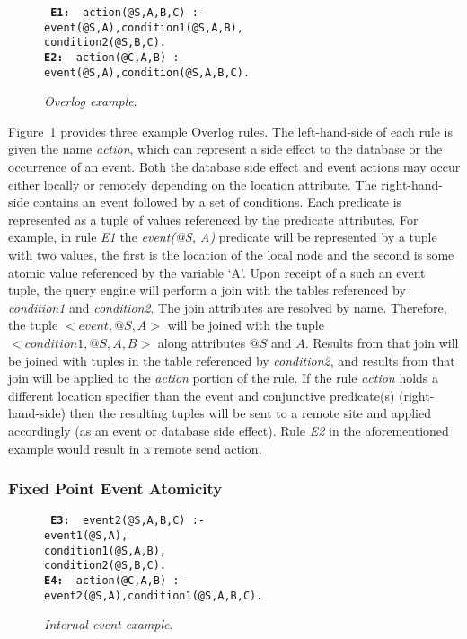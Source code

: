 {\begin{figure}
\centering
\begin{boxedminipage}{\linewidth}
\small{\tt
{\bf E1: } action(@S,A,B,C) :- \\
\datalogspace event(@S,A),condition1(@S,A,B), \\
\datalogspace condition2(@S,B,C). \\
{\bf E2: } action(@C,A,B) :- \\
\datalogspace event(@S,A),condition(@S,A,B,C).
}
\small{\caption{\label{fig:datalogeg}\emph{\small Overlog example}.}}
\end{boxedminipage}
\end{figure}
Figure~\ref{fig:datalogeg} provides three example Overlog rules.
The left-hand-side of each rule is given the name {\em action},
which can represent a side effect to the database or the occurrence of an event.
Both the database side effect and event actions may occur either locally or 
remotely depending on the location attribute.
The right-hand-side contains an event followed by a set of conditions.
Each predicate is represented as a tuple of values referenced by the
predicate attributes. For example, in rule {\em E1} the {\em event(@S, A)}
predicate will be represented by a tuple with two values, the first
is the location of the local node and the second is some atomic value 
referenced by the variable `A'. Upon receipt of a such an event tuple,
the query engine will perform a join with the tables referenced by
{\em condition1} and {\em condition2}. The join attributes are resolved
by name. Therefore, the tuple $<event, @S, A>$ will be joined with 
the tuple $<condition1, @S, A, B>$    
along attributes $@S$ and $A$.  Results from that join will be joined with
tuples in the table referenced by {\em condition2}, and results from that 
join will be applied to the {\em action} portion of the rule.  If the rule {\em action}
holds a different location specifier than the event and conjunctive predicate(s) 
(right-hand-side) then the resulting tuples will be sent to a remote site and applied
accordingly (as an event or database side effect). Rule {\em E2} in the 
aforementioned example would result in a remote send action.

\subsubsection{Fixed Point Event Atomicity}

\begin{figure}
\centering
\begin{boxedminipage}{\linewidth}
\small{\tt
{\bf E3: } event2(@S,A,B,C) :- \\
\datalogspace event1(@S,A), \\
\datalogspace condition1(@S,A,B), \\
\datalogspace condition2(@S,B,C). \\
{\bf E4: } action(@C,A,B)  :- \\
\datalogspace event2(@S,A),condition1(@S,A,B,C).
}
\small{\caption{\label{fig:datalogeg2}\emph{\small Internal event example}.}}
\end{boxedminipage}
\end{figure}

}
